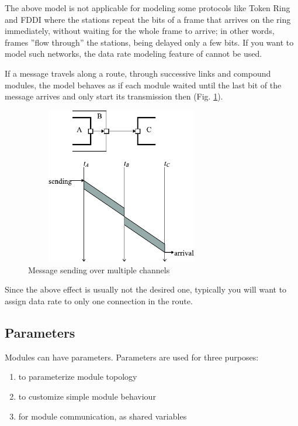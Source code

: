 The above model is not applicable for modeling some protocols like
Token Ring and FDDI where the stations repeat the bits of a frame that
arrives on the ring immediately, without waiting for the whole frame
to arrive; in other words, frames ''flow through'' the stations, being
delayed only a few bits. If you want to model such networks, the data
rate modeling feature of {\opp} cannot be used.

If a message travels along a route, through successive links and
compound modules, the model behaves as if each module waited until the
last bit of the message arrives and only start its transmission then
(Fig. \ref{fig:ch-overview:msg-multiple-ch}).

\begin{figure}[htbp]
\begin{center}
\includegraphics[width=3.330in, height=2.692in]{figures/usmanFig5}
\caption{Message sending over multiple channels}
\label{fig:ch-overview:msg-multiple-ch}
\end{center}
\end{figure}

Since the above effect is usually not the desired one, typically 
you will want to assign data rate to only one connection in the 
route.


\subsection{Parameters}

Modules can have parameters. Parameters are used for three purposes: 
\begin{enumerate}
  \item{to parameterize module topology}
  \item{to customize simple module behaviour}
  \item{for module communication, as shared variables}
\end{enumerate}

